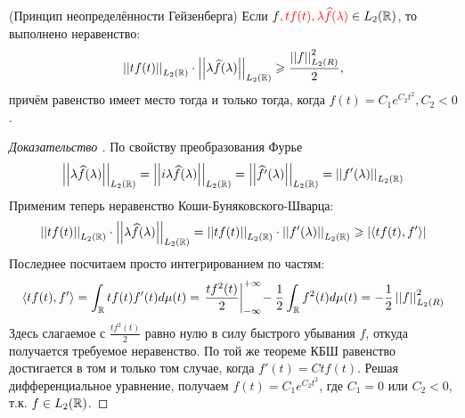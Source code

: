 \begin{theorem} (Принцип неопределённости Гейзенберга)
	Если $f\textcolor{red}{, tf(t), \lambda\widehat f(\lambda)} \in L_2(\mathbb{R})$, то выполнено неравенство:
	\[
		\left|\left|tf(t)\right|\right|_{L_2(\mathbb{R})} \cdot \left|\left|\lambda\widehat f(\lambda)\right|\right|_{L_2(\mathbb{R})} \geqslant \frac{\left|\left|f\right|\right|_{L_2(R)}^2}{2},
	\]
	причём равенство имеет место тогда и только тогда, когда $f(t) = C_1e^{C_2t^2}, C_2 < 0$.
\end{theorem}

\begin{proof}[Доказательство ]
	По свойству преобразования Фурье
	\[
		\left|\left|\lambda\widehat f(\lambda)\right|\right|_{L_2(\mathbb{R})} = \left|\left|i\lambda\widehat f(\lambda)\right|\right|_{L_2(\mathbb{R})} = \left|\left|\widehat{ f'}(\lambda)\right|\right|_{L_2(\mathbb{R})} = \left|\left|f'(\lambda)\right|\right|_{L_2(\mathbb{R})}
	\]
	Применим теперь неравенство Коши-Буняковского-Шварца:
	\[
		\left|\left|tf(t)\right|\right|_{L_2(\mathbb{R})} \cdot \left|\left|\lambda\widehat f(\lambda)\right|\right|_{L_2(\mathbb{R})} = \left|\left|tf(t)\right|\right|_{L_2(\mathbb{R})} \cdot \left|\left|f'(\lambda)\right|\right|_{L_2(\mathbb{R})} \geqslant \left|\left\langle tf(t), f'\right\rangle\right|
	\]
	Последнее посчитаем просто интегрированием по частям:
	\[
		\left\langle tf(t), f'\right\rangle = \int_{\mathbb{R}} tf(t)f'(t) d\mu(t) = \left.\frac{tf^2(t)}{2}\right \rvert_{-\infty}^{+\infty} \! - \frac{1}{2} \int_{\mathbb{R}} f^2(t) d\mu(t) = -\frac{1}{2} \left|\left|f\right|\right|_{L_2(R)}^2
	\]
	Здесь слагаемое с $\frac{tf^2(t)}{2}$ равно нулю в силу быстрого убывания $f$, откуда получается требуемое неравенство. По той же теореме КБШ равенство достигается в том и только том случае, когда $f'(t) = Ctf(t)$. Решая дифференциальное уравнение, получаем $f(t) = C_1e^{C_2t^2}$, где $C_1 = 0$ или $C_2 < 0$, т.к. $f \in L_2(\mathbb{R})$.
\end{proof}
